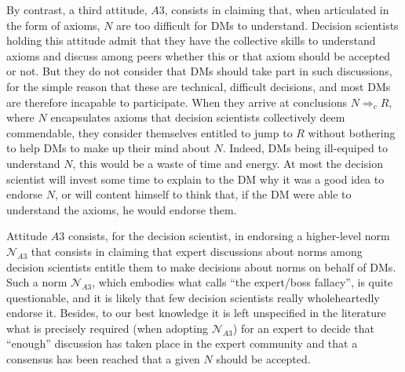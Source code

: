 \documentclass[preprint, french, english, 11pt, authoryear]{elsarticle}%
\begin{document}
By contrast, a third attitude, $A3$, consists in claiming that, when articulated in the form of axioms, $N$ are too difficult for \acp{DM} to understand. Decision scientists holding this attitude admit that they have the collective skills to understand axioms and discuss among peers whether this or that axiom should be accepted or not. But they do not consider that \acp{DM} should take part in such discussions, for the simple reason that these are technical, difficult decisions, and most \acp{DM} are therefore incapable to participate. When they arrive at conclusions $N ⇒_c R$, where $N$ encapsulates axioms that decision scientists collectively deem commendable, they consider themselves entitled to jump to $R$ without bothering to help \acp{DM} to make up their mind about $N$. Indeed, \acp{DM} being ill-equiped to understand $N$, this would be a waste of time and energy. At most the decision scientist will invest some time to explain to the \ac{DM} why it was a good idea to endorse $N$, or will content himself to think that, if the \ac{DM} were able to understand the axioms, he would endorse them.

Attitude $A3$ consists, for the decision scientist, in endorsing a higher-level norm $\mathscr{N}_{A3}$ that consists in claiming that expert discussions about norms among decision scientists entitle them to make decisions about norms on behalf of \acp{DM}. Such a norm $\mathscr{N}_{A3}$, which embodies what \citet{estlund_democratic_2009} calls “the expert/boss fallacy”, is quite questionable, and it is likely that few decision scientists really wholeheartedly endorse it. Besides, to our best knowledge it is left unspecified in the literature what is precisely required (when adopting  $\mathscr{N}_{A3}$) for an expert to decide that “enough” discussion has taken place in the expert community and that a consensus has been reached that a given $N$ should be accepted. 
\end{document}
